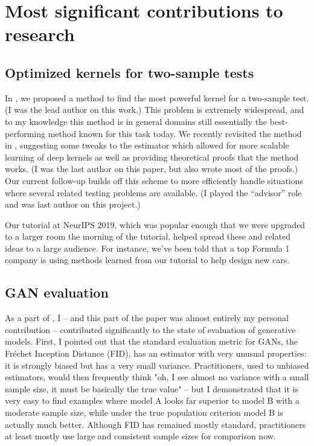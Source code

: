 \documentclass[12pt]{article}
\begin{document}
\section{Most significant contributions to research}


\subsection{Optimized kernels for two-sample tests}

In \cite{sutherland:opt-mmd}, we proposed a method to find the most powerful kernel for a two-sample test. (I was the lead author on this work.) This problem is extremely widespread, and to my knowledge this method is in general domains still essentially the best-performing method known for this task today. We recently revisited the method in \cite{liu:deep-testing}, suggesting some tweaks to the estimator which allowed for more scalable learning of deep kernels as well as providing theoretical proofs that the method works. (I was the last author on this paper, but also wrote most of the proofs.) Our current follow-up \cite{liu:meta-2st} builds off this scheme to more efficiently handle situations where several related testing problems are available. (I played the ``advisor'' role and was last author on this project.)

Our tutorial at NeurIPS 2019, which was popular enough that we were upgraded to a larger room the morning of the tutorial, helped spread these and related ideas to a large audience. For instance, we've been told that a top Formula 1 company is using methods learned from our tutorial to help design new cars.


\subsection{GAN evaluation}

As a part of \cite{binkowski:mmd-gans}, I – and this part of the paper was almost entirely my personal contribution – contributed significantly to the state of evaluation of generative models. First, I pointed out that the standard evaluation metric for GANs, the Fréchet Inception Distance (FID), has an estimator with very unusual properties: it is strongly biased but has a very small variance. Practitioners, used to unbiased estimators, would then frequently think "oh, I see almost no variance with a small sample size, it must be basically the true value" – but I demonstrated that it is very easy to find examples where model A looks far superior to model B with a moderate sample size, while under the true population criterion model B is actually much better. Although FID has remained mostly standard, practitioners at least mostly use large and consistent sample sizes for comparison now.
\end{document}
